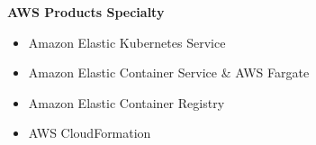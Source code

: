 \textbf{AWS Products Specialty}
\begin{itemize}
    \item Amazon Elastic Kubernetes Service
    \item Amazon Elastic Container Service \& AWS Fargate
    \item Amazon Elastic Container Registry
    \item AWS CloudFormation
\end{itemize}